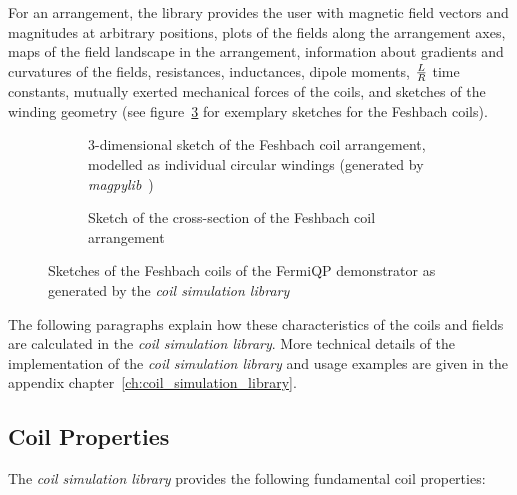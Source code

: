 For an arrangement, the library provides the user with magnetic field vectors and magnitudes at arbitrary positions, plots of the fields along the arrangement axes, maps of the field landscape in the arrangement, information about gradients and curvatures of the fields, resistances, inductances, dipole moments, $L\over R$ time constants, mutually exerted mechanical forces of the coils, and sketches of the winding geometry (see figure~\ref{fig:csl_sketches} for exemplary sketches for the Feshbach coils).

\begin{figure}
    \centering
    \begin{subfigure}[t]{0.47\textwidth}
        \centering
        \resizebox{\textwidth}{!}{
            \begin{pgfpicture}
                \pgftext{}
            \end{pgfpicture}
        }
        \caption{3-dimensional sketch of the Feshbach coil arrangement, modelled as individual circular windings (generated by \textit{magpylib}~\cite{noauthor_magpylibmagpylib_nodate})}
        \label{fig:csl_sketches_3d}
    \end{subfigure}
    \hspace{0.04\textwidth}
    \begin{subfigure}[t]{0.47\textwidth}
        \centering
        \resizebox{\textwidth}{!}{
            \begin{pgfpicture}
                \pgftext{}
            \end{pgfpicture}
        }
        \caption{Sketch of the cross-section of the Feshbach coil arrangement}
        \label{fig:csl_sketches_cross_section}
    \end{subfigure}
    \caption{Sketches of the Feshbach coils of the FermiQP demonstrator as generated by the \textit{coil simulation library}}
    \label{fig:csl_sketches}
\end{figure}

The following paragraphs explain how these characteristics of the coils and fields are calculated in the \textit{coil simulation library}. More technical details of the implementation of the \textit{coil simulation library} and usage examples are given in the appendix chapter~\ref{ch:coil_simulation_library}. 

\subsection*{Coil Properties}
The \textit{coil simulation library} provides the following fundamental coil properties:

